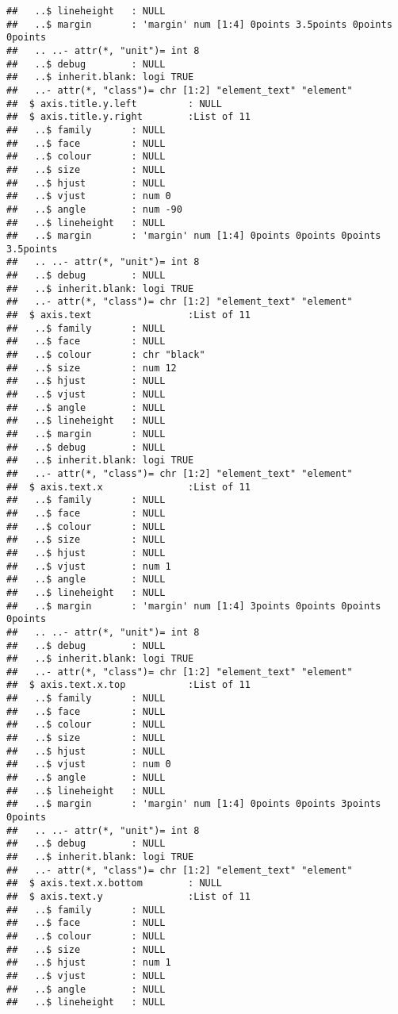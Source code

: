 \documentclass[
]{article}
\begin{document}
\begin{verbatim}
##   ..$ lineheight   : NULL
##   ..$ margin       : 'margin' num [1:4] 0points 3.5points 0points 0points
##   .. ..- attr(*, "unit")= int 8
##   ..$ debug        : NULL
##   ..$ inherit.blank: logi TRUE
##   ..- attr(*, "class")= chr [1:2] "element_text" "element"
##  $ axis.title.y.left         : NULL
##  $ axis.title.y.right        :List of 11
##   ..$ family       : NULL
##   ..$ face         : NULL
##   ..$ colour       : NULL
##   ..$ size         : NULL
##   ..$ hjust        : NULL
##   ..$ vjust        : num 0
##   ..$ angle        : num -90
##   ..$ lineheight   : NULL
##   ..$ margin       : 'margin' num [1:4] 0points 0points 0points 3.5points
##   .. ..- attr(*, "unit")= int 8
##   ..$ debug        : NULL
##   ..$ inherit.blank: logi TRUE
##   ..- attr(*, "class")= chr [1:2] "element_text" "element"
##  $ axis.text                 :List of 11
##   ..$ family       : NULL
##   ..$ face         : NULL
##   ..$ colour       : chr "black"
##   ..$ size         : num 12
##   ..$ hjust        : NULL
##   ..$ vjust        : NULL
##   ..$ angle        : NULL
##   ..$ lineheight   : NULL
##   ..$ margin       : NULL
##   ..$ debug        : NULL
##   ..$ inherit.blank: logi TRUE
##   ..- attr(*, "class")= chr [1:2] "element_text" "element"
##  $ axis.text.x               :List of 11
##   ..$ family       : NULL
##   ..$ face         : NULL
##   ..$ colour       : NULL
##   ..$ size         : NULL
##   ..$ hjust        : NULL
##   ..$ vjust        : num 1
##   ..$ angle        : NULL
##   ..$ lineheight   : NULL
##   ..$ margin       : 'margin' num [1:4] 3points 0points 0points 0points
##   .. ..- attr(*, "unit")= int 8
##   ..$ debug        : NULL
##   ..$ inherit.blank: logi TRUE
##   ..- attr(*, "class")= chr [1:2] "element_text" "element"
##  $ axis.text.x.top           :List of 11
##   ..$ family       : NULL
##   ..$ face         : NULL
##   ..$ colour       : NULL
##   ..$ size         : NULL
##   ..$ hjust        : NULL
##   ..$ vjust        : num 0
##   ..$ angle        : NULL
##   ..$ lineheight   : NULL
##   ..$ margin       : 'margin' num [1:4] 0points 0points 3points 0points
##   .. ..- attr(*, "unit")= int 8
##   ..$ debug        : NULL
##   ..$ inherit.blank: logi TRUE
##   ..- attr(*, "class")= chr [1:2] "element_text" "element"
##  $ axis.text.x.bottom        : NULL
##  $ axis.text.y               :List of 11
##   ..$ family       : NULL
##   ..$ face         : NULL
##   ..$ colour       : NULL
##   ..$ size         : NULL
##   ..$ hjust        : num 1
##   ..$ vjust        : NULL
##   ..$ angle        : NULL
##   ..$ lineheight   : NULL

\end{verbatim}
\end{document}
